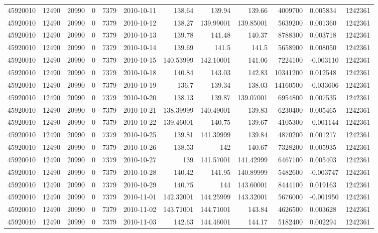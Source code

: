 \begin{tabular}{l | r | r | r | r | l | r | r | r | r | l | r}
45920010 & 12490 & 20990 & 0 & 7379 & 2010-10-11 & 138.64 & 139.94 & 139.66 & 4009700 & 0.005834 & 1242361 \\
45920010 & 12490 & 20990 & 0 & 7379 & 2010-10-12 & 138.27 & 139.99001 & 139.85001 & 5639200 & 0.001360 & 1242361 \\
45920010 & 12490 & 20990 & 0 & 7379 & 2010-10-13 & 139.78 & 141.48 & 140.37 & 8788300 & 0.003718 & 1242361 \\
45920010 & 12490 & 20990 & 0 & 7379 & 2010-10-14 & 139.69 & 141.5 & 141.5 & 5658900 & 0.008050 & 1242361 \\
45920010 & 12490 & 20990 & 0 & 7379 & 2010-10-15 & 140.53999 & 142.10001 & 141.06 & 7224100 & -0.003110 & 1242361 \\
45920010 & 12490 & 20990 & 0 & 7379 & 2010-10-18 & 140.84 & 143.03 & 142.83 & 10341200 & 0.012548 & 1242361 \\
45920010 & 12490 & 20990 & 0 & 7379 & 2010-10-19 & 136.7 & 139.34 & 138.03 & 14160500 & -0.033606 & 1242361 \\
45920010 & 12490 & 20990 & 0 & 7379 & 2010-10-20 & 138.13 & 139.87 & 139.07001 & 6954800 & 0.007535 & 1242361 \\
45920010 & 12490 & 20990 & 0 & 7379 & 2010-10-21 & 138.39999 & 140.49001 & 139.83 & 6230400 & 0.005465 & 1242361 \\
45920010 & 12490 & 20990 & 0 & 7379 & 2010-10-22 & 139.46001 & 140.75 & 139.67 & 4105300 & -0.001144 & 1242361 \\
45920010 & 12490 & 20990 & 0 & 7379 & 2010-10-25 & 139.81 & 141.39999 & 139.84 & 4870200 & 0.001217 & 1242361 \\
45920010 & 12490 & 20990 & 0 & 7379 & 2010-10-26 & 138.53 & 142 & 140.67 & 7328200 & 0.005935 & 1242361 \\
45920010 & 12490 & 20990 & 0 & 7379 & 2010-10-27 & 139 & 141.57001 & 141.42999 & 6467100 & 0.005403 & 1242361 \\
45920010 & 12490 & 20990 & 0 & 7379 & 2010-10-28 & 140.42 & 141.95 & 140.89999 & 5482600 & -0.003747 & 1242361 \\
45920010 & 12490 & 20990 & 0 & 7379 & 2010-10-29 & 140.75 & 144 & 143.60001 & 8444100 & 0.019163 & 1242361 \\
45920010 & 12490 & 20990 & 0 & 7379 & 2010-11-01 & 142.32001 & 144.25999 & 143.32001 & 5676000 & -0.001950 & 1242361 \\
45920010 & 12490 & 20990 & 0 & 7379 & 2010-11-02 & 143.71001 & 144.71001 & 143.84 & 4626500 & 0.003628 & 1242361 \\
45920010 & 12490 & 20990 & 0 & 7379 & 2010-11-03 & 142.63 & 144.46001 & 144.17 & 5182400 & 0.002294 & 1242361 \\

\end{tabular}
